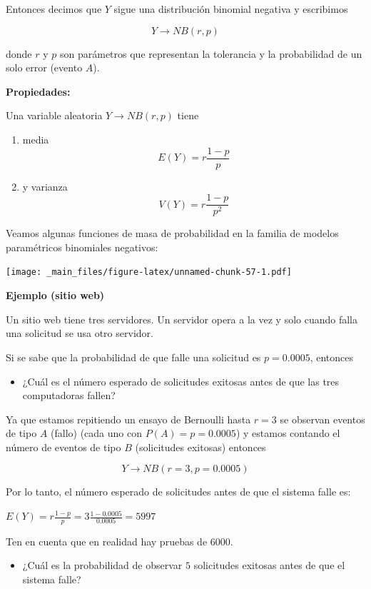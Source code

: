 \documentclass[
]{book}
\providecommand{\tightlist}{%
  \setlength{\itemsep}{0pt}\setlength{\parskip}{0pt}}
\begin{document}
Entonces decimos que \(Y\) sigue una distribución binomial negativa y escribimos

\[Y\rightarrow NB(r,p)\]

donde \(r\) y \(p\) son parámetros que representan la tolerancia y la probabilidad de un solo error (evento \(A\)).

\textbf{Propiedades:}

Una variable aleatoria \(Y\rightarrow NB(r,p)\) tiene

\begin{enumerate}
\def\labelenumi{\arabic{enumi})}
\item
  media \[E(Y)= r\frac{1-p}{p}\]
\item
  y varianza \[V(Y)= r\frac{1-p}{p^2}\]
\end{enumerate}

Veamos algunas funciones de masa de probabilidad en la familia de modelos paramétricos binomiales negativos:

\texttt{[image: \_main\_files/figure-latex/unnamed-chunk-57-1.pdf]}

\textbf{Ejemplo (sitio web)}

Un sitio web tiene tres servidores. Un servidor opera a la vez y solo cuando falla una solicitud se usa otro servidor.

Si se sabe que la probabilidad de que falle una solicitud es \(p=0.0005\), entonces

\begin{itemize}
\tightlist
\item
  ¿Cuál es el número esperado de solicitudes exitosas antes de que las tres computadoras fallen?
\end{itemize}

Ya que estamos repitiendo un ensayo de Bernoulli hasta \(r=3\) se observan eventos de tipo \(A\) (fallo) (cada uno con \(P(A)=p=0.0005\)) y estamos contando el número de eventos de tipo \(B\) (solicitudes exitosas) entonces

\[Y \rightarrow NB(r=3, p=0.0005)\]

Por lo tanto, el número esperado de solicitudes antes de que el sistema falle es:

\(E(Y)=r\frac{1-p}{p}=3\frac{1-0.0005}{0.0005}=5997\)

Ten en cuenta que en realidad hay pruebas de \(6000\).

\begin{itemize}
\tightlist
\item
  ¿Cuál es la probabilidad de observar \(5\) solicitudes exitosas antes de que el sistema falle?
\end{itemize}
\end{document}
